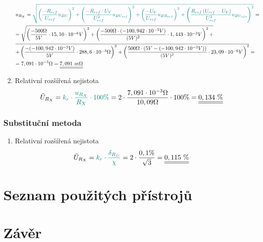 \documentclass[a4paper, czech]{article}
\begin{document}
\begin{enumerate}
    \begin{multline*}
        u_{R_X} = \textcolor{teal}{\sqrt{\left(\frac{-R_{ref}}{U_{ref}} u_{BU}\right)^2 + \left(\frac{-R_{ref} \cdot U_V}{U_{ref}^2} u_{BU_{ref}}\right)^2 + \left(\frac{-U_V}{U_{ref}} u_{BR_{ref}}\right)^2 + \left(\frac{R_{ref} \left(U_{ref} - U_V\right)}{U_{ref}^2} u_{BU_{ofs}}\right)^2}} = \hfill \\
        = \sqrt{\left(\frac{-500 \Omega}{5V} \cdot 15,10 \cdot 10^{-6} V\right)^2 + \left(\frac{-500 \Omega \cdot (- 100,942 \cdot 10^{-3}V)}{(5V)^2} \cdot 1,443 \cdot 10^{-3}V\right)^2 + } \hfill \\
        \overline{+ \left(\frac{-(- 100,942 \cdot 10^{-3}V)}{5V} \cdot 288,6 \cdot 10^{-3} \Omega\right)^2 + \left(\frac{500 \Omega \cdot \left(5V - (- 100,942 \cdot 10^{-3}V)\right)}{(5V)^2} \cdot 23,09 \cdot 10^{-6} V\right)^2} = \hfill \\
        = 7,091 \cdot 10^{-3} \Omega = \underline{\underline{7,091\ m\Omega}} \hfill
    \end{multline*}
    \item Relativní rozšířená nejistota
    \begin{multline*}
        \tilde{U}_{R_X} = \textcolor{teal}{k_r \cdot \frac{u_{R_X}}{R_X} \cdot 100 \%} = 2 \cdot \frac{7,091 \cdot 10^{-3} \Omega}{10,09 \Omega} \cdot 100 \% = \underline{\underline{0,134\ \%}} \hfill
    \end{multline*}
\end{enumerate}

\subsubsection{Substituční metoda}

\begin{enumerate}
    \item Relativní rozšířená nejistota
    \begin{multline*}
        \tilde{U}_{R_X} = \textcolor{teal}{k_r \cdot \frac{\delta_{R_D}}{\chi}} = 2 \cdot \frac{0,1\%}{\sqrt{3}} = \underline{\underline{0,115\ \%}} \hfill
    \end{multline*}
\end{enumerate}

\section{Seznam použitých přístrojů}

\section{Závěr}
\end{document}
